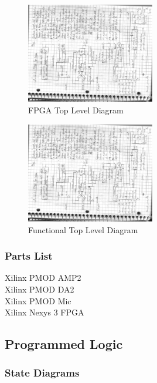 \documentclass[12pt]{article}
\begin{document}
\begin{figure}[h]
\centering
\includegraphics[width=0.5\textwidth, height=0.5\textheight, angle=270]{FPGAtop.eps}
\caption{FPGA Top Level Diagram}
\end{figure}

\begin{figure}[h]
\centering
\includegraphics[width=0.5\textwidth, height=0.5\textheight, angle=270]{functional.eps}
\caption{Functional Top Level Diagram}
\end{figure}

\subsubsection{Parts List}
Xilinx PMOD AMP2
\\Xilinx PMOD DA2
\\Xilinx PMOD Mic
\\Xilinx Nexys 3 FPGA

\subsection{Programmed Logic}
\subsubsection{State Diagrams}
\end{document}
